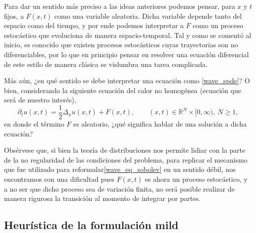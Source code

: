 \documentclass[letterpaper,twoside,12pt]{book}
\newcommand{\R}{\mathbb{R}}
\newcommand{\1}{\mathds{1}}
\theoremstyle{definition}
\theoremstyle{definition}
\theoremstyle{remark}
\theoremstyle{definition}
\theoremstyle{definition}
\theoremstyle{definition}
\theoremstyle{definition}
\theoremstyle{definition}
\begin{document}
Para dar un sentido más preciso a las ideas anteriores podemos pensar, para $x$ y $t$ fijos, a $F(x,t)$ como una variable aleatoria. Dicha variable depende tanto del espacio como del tiempo, y por ende podemos interpretar a $F$ como un proceso estocástico que evoluciona de manera espacio-temporal. Tal y como se comentó al inicio, es conocido que existen procesos estocásticos cuyas trayectorias son no diferenciables, por lo que en principio pensar en resolver una ecuación diferencial de este estilo de manera clásica se vislumbra una tarea complicada.

Más aún, ¿en qué sentido se debe interpretar una ecuación como \eqref{wave_spde}? O bien, considerando la siguiente ecuación del calor no homogénea (ecuación que será de nuestro interés),  
\begin{equation}\label{heat_spde}
    \partial_t{u(x,t)}=\frac{1}{2}\Delta_{x}u(x,t)+F(x,t), \qquad (x,t)\in \R^{N}\times[0,\infty), \ N\geq1,
\end{equation}
en donde el término $F$ es aleatorio, ¿qué significa hablar de una solución a dicha ecuación?

Obsérvese que, si bien la teoría de distribuciones nos permite lidiar con la parte de la no regularidad de las condiciones del problema, para replicar el mecanismo que fue utilizado para reformular\eqref{wave_eq_sobolev} en un sentido débil, nos encontramos con una dificultad pues $F(x,t)$ es ahora un proceso estocástico, y a no ser que dicho proceso sea de variación finita, no será posible realizar de manera rigurosa la transición al momento de integrar por partes.

\subsection{Heurística de la formulación mild}
\end{document}
